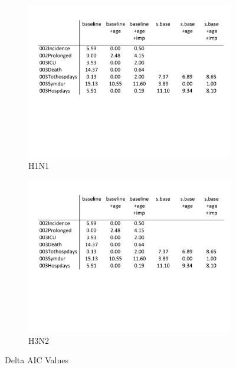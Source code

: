 \documentclass[12pt,twoside]{article}
\begin{document}
        
    \begin{figure}[h]
        \centering
        \begin{subfigure}{.475\textwidth}
            \includegraphics[width=\textwidth, page=1]{AIC_tables}
            \caption{H1N1}
        \end{subfigure}\hfill
                \begin{subfigure}{.475\textwidth}
            \includegraphics[width=\textwidth, page=2]{AIC_tables}
            \caption{H3N2}
        \end{subfigure}\hfill
        \caption[Network]{Delta AIC Values}
        \end{figure}
 
\end{document}
